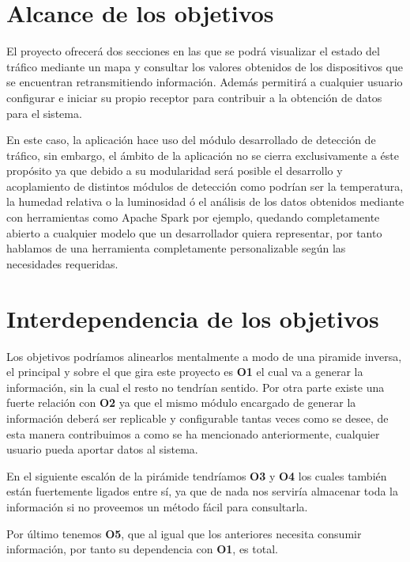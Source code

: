 \section{Alcance de los objetivos}

El proyecto ofrecerá dos secciones en las que se podrá visualizar el estado del tráfico mediante un mapa y consultar los valores obtenidos de los dispositivos que se encuentran retransmitiendo información. Además permitirá a cualquier usuario configurar e iniciar su propio receptor para contribuir a la obtención de datos para el sistema.

\bigskip
En este caso, la aplicación hace uso del módulo desarrollado de detección de tráfico, sin embargo, el ámbito de la aplicación no se cierra exclusivamente a éste propósito ya que debido a su modularidad será posible el desarrollo y acoplamiento de distintos módulos de detección como podrían ser la temperatura, la humedad relativa o la luminosidad ó el análisis de los datos obtenidos mediante con herramientas como Apache Spark por ejemplo, quedando completamente abierto a cualquier modelo que un desarrollador quiera representar, por tanto hablamos de una herramienta completamente personalizable según las necesidades requeridas.


\section{Interdependencia de los objetivos}

Los objetivos podríamos alinearlos mentalmente a modo de una piramide inversa, el principal y sobre el que gira este proyecto es \textbf{O1} el cual va a generar la información, sin la cual el resto no tendrían sentido. Por otra parte existe una fuerte relación con \textbf{O2} ya que el mismo módulo encargado de generar la información deberá ser replicable y configurable tantas veces como se desee, de esta manera contribuimos a como se ha mencionado anteriormente, cualquier usuario pueda aportar datos al sistema.

En el siguiente escalón de la pirámide tendríamos \textbf{O3} y \textbf{O4} los cuales también están fuertemente ligados entre sí, ya que de nada nos serviría almacenar toda la información si no proveemos un método fácil para consultarla.

Por último tenemos \textbf{O5}, que al igual que los anteriores necesita consumir información, por tanto su dependencia con \textbf{O1}, es total.
